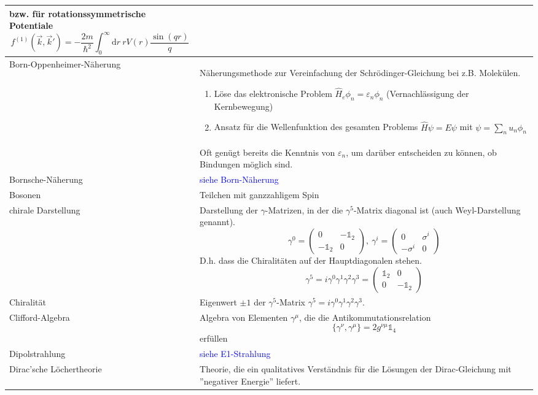 \documentclass{article}
\newcommand{\diff}{\mathrm{d}}
\begin{document}
\begin{xltabular}{\linewidth}{p{6cm}|X}
		bzw. für rotationssymmetrische Potentiale
			$$f^{(1)}(\vec{k},\vec{k}') = -\frac{2m}{\hbar^2} \int_0^\infty \diff r\ r V(r) \frac{\sin(qr)}{q}$$ \\
	\hline
		Born-Oppenheimer-Näherung & Näherungsmethode zur Vereinfachung der Schrödinger-Gleichung bei z.B. Molekülen.
		{\begin{enumerate}
			\item Löse das elektronische Problem $\hat{H}_e \phi_n = \varepsilon_n \phi_n$ (Vernachlässigung der Kernbewegung)
			\item Ansatz für die Wellenfunktion des gesamten Problems $\hat{H}\psi = E\psi$ mit $\psi = \sum_n u_n\phi_n$
		\end{enumerate}} \\
		& Oft genügt bereits die Kenntnis von $\varepsilon_n$, um darüber entscheiden zu können, ob Bindungen möglich sind. \\
	\hline
		Bornsche-Näherung & \textcolor{blue}{siehe Born-Näherung} \\
	\hline
		Bosonen & Teilchen mit ganzzahligem Spin \\	
	\hline
		chirale Darstellung & Darstellung der $\gamma$-Matrizen, in der die $\gamma^5$-Matrix diagonal ist (auch Weyl-Darstellung genannt).
			$$\gamma^0 = 
				\begin{pmatrix}
					0 & -\mathbb{1}_2 \\
					-\mathbb{1}_2 & 0
				\end{pmatrix},\
				\gamma^i = 
				\begin{pmatrix}
					0 & \sigma^i \\
					-\sigma^i & 0
				\end{pmatrix}$$
		D.h. dass die Chiralitäten auf der Hauptdiagonalen stehen.
			$$\gamma^5 = i\gamma^0\gamma^1\gamma^2\gamma^3 = 
			\begin{pmatrix}
				\mathbb{1}_2 & 0 \\
				0 & -\mathbb{1}_2
			\end{pmatrix}$$ \\
	\hline
		Chiralität & Eigenwert $\pm 1$ der $\gamma^5$-Matrix $\gamma^5 = i\gamma^0\gamma^1\gamma^2\gamma^3$. \\
	\hline
		Clifford-Algebra & Algebra von Elementen $\gamma^\mu$, die die Antikommutationsrelation
			$$\{\gamma^\nu,\gamma^\mu\} = 2g^{\nu\mu}\mathbb{1}_4$$
			erfüllen \\
	\hline
		Dipolstrahlung & \textcolor{blue}{siehe E1-Strahlung} \\
	\hline
		Dirac'sche Löchertheorie & Theorie, die ein qualitatives Verständnis für die Lösungen der Dirac-Gleichung mit ''negativer Energie'' liefert. \\

\end{xltabular}
\end{document}

